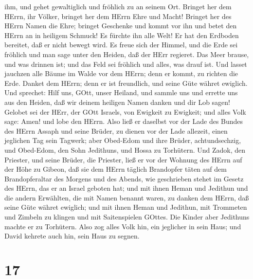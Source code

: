 ihm, und gehet gewaltiglich und fröhlich zu an seinem Ort. 
Bringet her dem HErrn, ihr Völker, bringet her dem HErrn Ehre und Macht!
 Bringet her des HErrn Namen die Ehre; bringet Geschenke
und kommt vor ihn und betet den HErrn an in heiligem Schmuck!
 Es fürchte ihn alle Welt! Er hat den Erdboden bereitet,
daß er nicht bewegt wird.  Es freue sich der Himmel, und
die Erde sei fröhlich und man sage unter den Heiden, daß der HErr
regieret.  Das Meer brause, und was drinnen ist; und das
Feld sei fröhlich und alles, was drauf ist.  Und lasset
jauchzen alle Bäume im Walde vor dem HErrn; denn er kommt, zu richten
die Erde.  Danket dem HErrn; denn er ist freundlich, und
seine Güte währet ewiglich.  Und sprechet: Hilf uns, GOtt,
unser Heiland, und sammle uns und errette uns aus den Heiden, daß wir
deinem heiligen Namen danken und dir Lob sagen!  Gelobet
sei der HErr, der GOtt Israels, von Ewigkeit zu Ewigkeit; und alles Volk
sage: Amen! und lobe den HErrn.  Also ließ er daselbst vor
der Lade des Bundes des HErrn Assaph und seine Brüder, zu dienen vor der
Lade allezeit, einen jeglichen Tag sein Tagwerk;  aber
Obed-Edom und ihre Brüder, achtundsechzig, und Obed-Edom, den Sohn
Jedithuns, und Hossa zu Torhütern.  Und Zadok, den
Priester, und seine Brüder, die Priester, ließ er vor der Wohnung des
HErrn auf der Höhe zu Gibeon,  daß sie dem HErrn täglich
Brandopfer täten auf dem Brandopferaltar des Morgens und des Abends, wie
geschrieben stehet im Gesetz des HErrn, das er an Israel geboten hat;
 und mit ihnen Heman und Jedithun und die andern Erwählten,
die mit Namen benannt waren, zu danken dem HErrn, daß seine Güte währet
ewiglich;  und mit ihnen Heman und Jedithun, mit Trommeten
und Zimbeln zu klingen und mit Saitenspielen GOttes. Die Kinder aber
Jedithuns machte er zu Torhütern.  Also zog alles Volk hin,
ein jeglicher in sein Haus; und David kehrete auch hin, sein Haus zu
segnen.

\hypertarget{section-16}{%
\section{17}\label{section-16}}

